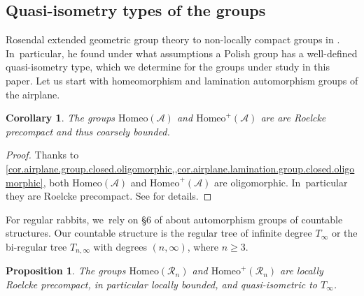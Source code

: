 \documentclass[JEP,XML,SOM,Unicode,NoFloatCountersInSection,published]{cedram}
\theoremstyle{plain}
\newtheorem{corollary}[theorem]{Corollary}
\newtheorem{proposition}[theorem]{Proposition}
\theoremstyle{definition}
\theoremstyle{remark}
\newcommand{\Homeo}{\mathrm{Homeo}}
\newcommand{\A}{\mathcal{A}}
\newcommand{\R}{\mathcal{R}}
\begin{document}
\subsection{Quasi-isometry types of the groups}

Rosendal extended geometric group theory to non-locally compact groups in \cite{MR4327092}. In~particular, he found under what assumptions a Polish group has a well-defined quasi-isometry type, which we determine for the groups under study in this paper.
Let us start with homeomorphism and lamination automorphism groups of the airplane.

\begin{corollary}
\label{cor.airplane.QItype}
The groups $\Homeo(\A)$ and $\Homeo^+(\A)$ are are Roelcke precompact and thus coarsely bounded.
\end{corollary}

\begin{proof}
Thanks to \cref{cor.airplane.group.closed.oligomorphic,,cor.airplane.lamination.group.closed.oligomorphic}, both $\Homeo(\A)$ and $\Homeo^+(\A)$ are oligomorphic. In~particular they are Roelcke precompact.
See \cite[\S 3.1]{MR4327092} for details.
\end{proof}

For regular rabbits, we~rely on \S 6 of \cite{MR4327092} about automorphism groups of countable structures.
Our countable structure is the regular tree of infinite degree $T_\infty$ or the bi-regular tree $T_{n,\infty}$ with degrees $(n,\infty)$, where $n\geq3$.

\begin{proposition}
\label{prop.rabbit.QItype}
The groups $\Homeo(\R_n)$ and $\Homeo^+(\R_n)$ are locally Roelcke precompact, in particular locally bounded, and quasi-isometric to $T_\infty$.
\end{proposition}
\end{document}
